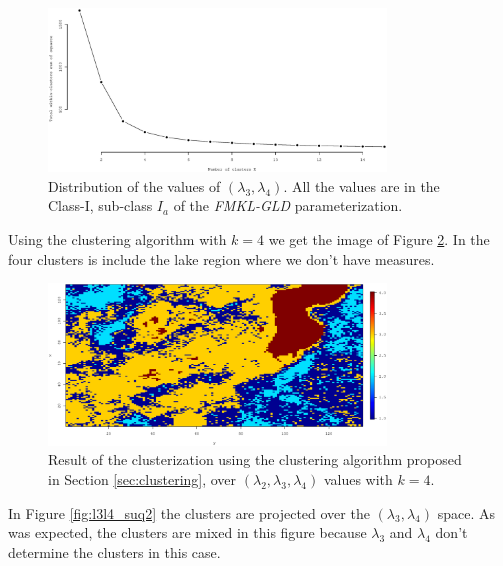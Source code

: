 \begin{figure}[H]
    \centering
    \includegraphics[width=0.8\textwidth]{img/use_cases/spus/optim_clusters.eps}
    \caption{Distribution of the values of $(\lambda_{3}, \lambda_{4})$. All the values are in the Class-I, sub-class $I_{a}$ of the \textit{FMKL-GLD} parameterization.}
    \label{fig:optim_clusters}
\end{figure}

Using the clustering algorithm with $k=4$ we get the image of Figure \ref{fig:image_suq2}. In the four clusters is include the lake region where we don't have measures.

\begin{figure}[H]
    \centering
    \includegraphics[width=0.8\textwidth]{img/use_cases/spus/clusters_image.eps}
    \caption{Result of the clusterization using the clustering algorithm proposed in Section \ref{sec:clustering}, over $(\lambda_{2}, \lambda_{3}, \lambda_{4})$ values with $k=4$.}
    \label{fig:image_suq2}
\end{figure}

In Figure \ref{fig:l3l4_suq2} the clusters are projected over the $(\lambda_{3}, \lambda_{4})$ space. As was expected, the clusters are mixed in this figure because $\lambda_{3}$ and $\lambda_{4}$ don't determine the clusters in this case.

